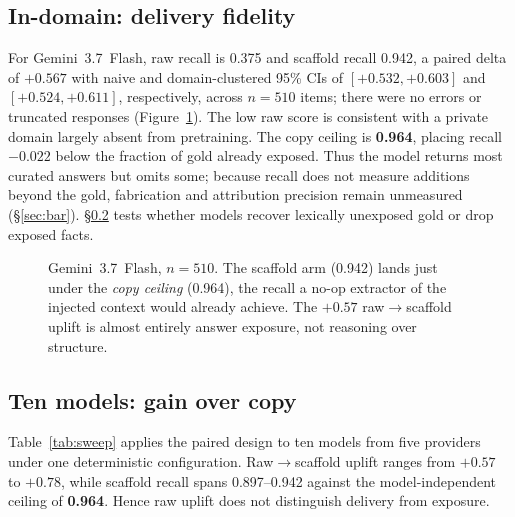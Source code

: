 \documentclass[10pt,twocolumn]{article}
\begin{document}
\subsection{In-domain: delivery fidelity}\label{sec:indomain}
For Gemini~3.7~Flash, raw recall is 0.375 and scaffold recall 0.942, a paired delta of $\mathbf{+0.567}$ with naive and domain-clustered 95\% CIs of $[+0.532,+0.603]$ and $[+0.524,+0.611]$, respectively, across $n=510$ items; there were no errors or truncated responses (Figure~\ref{fig:anchor}). The low raw score is consistent with a private domain largely absent from pretraining. The copy ceiling is \textbf{0.964}, placing recall $-0.022$ below the fraction of gold already exposed. Thus the model returns most curated answers but omits some; because recall does not measure additions beyond the gold, fabrication and attribution precision remain unmeasured (\S\ref{sec:bar}). \S\ref{sec:tenmodel} tests whether models recover lexically unexposed gold or drop exposed facts.

\begin{figure}[t]\centering
{}
\caption{Gemini~3.7~Flash, $n=510$. The scaffold arm (0.942) lands just under the \emph{copy ceiling}
(0.964), the recall a no-op extractor of the injected context would already achieve. The $+0.57$
raw$\to$scaffold uplift is almost entirely answer exposure, not reasoning over structure.}
\label{fig:anchor}
\end{figure}

\subsection{Ten models: gain over copy}\label{sec:tenmodel}
Table~\ref{tab:sweep} applies the paired design to ten models from five providers under one deterministic configuration. Raw$\to$scaffold uplift ranges from $+0.57$ to $+0.78$, while scaffold recall spans 0.897--0.942 against the model-independent ceiling of \textbf{0.964}. Hence raw uplift does not distinguish delivery from exposure.
\end{document}
